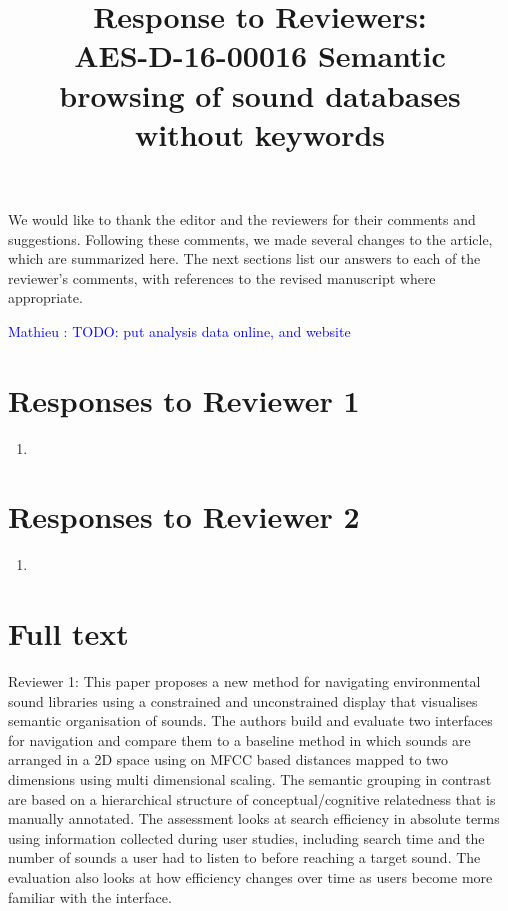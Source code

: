 \documentclass[10pt]{article}
\title{Response to Reviewers: \\ AES-D-16-00016
Semantic browsing of sound databases without keywords}
\newcommand{\ml}[1]{\textcolor{blue}{ Mathieu : #1}}
\begin{document}
\maketitle

We would like to thank the editor and the reviewers for their comments and suggestions. Following these comments, we made several changes to the article, which are summarized here. The next sections list our answers to each of the reviewer’s comments, with references to the revised manuscript where appropriate.

\ml{TODO: put analysis data online, and website}

\section{Responses to Reviewer 1}


\begin{enumerate}

\item \emph{}

\end{enumerate}

\section{Responses to Reviewer 2}


\begin{enumerate}

\item \emph{}

\end{enumerate}

\section{Full text}

Reviewer 1: This paper proposes a new method for navigating environmental sound libraries using a constrained and unconstrained display that visualises semantic organisation of sounds. The authors build and evaluate two interfaces for navigation and compare them to a baseline method in which sounds are arranged in a 2D space using on MFCC based distances mapped to two dimensions using multi dimensional scaling. The semantic grouping in contrast are based on a hierarchical structure of conceptual/cognitive relatedness that is manually annotated. The assessment looks at search efficiency in absolute terms using information collected during user studies, including search time and the number of sounds a user had to listen to before reaching a target sound. The evaluation also looks at how efficiency changes over time as users become more familiar with the interface.
\end{document}
